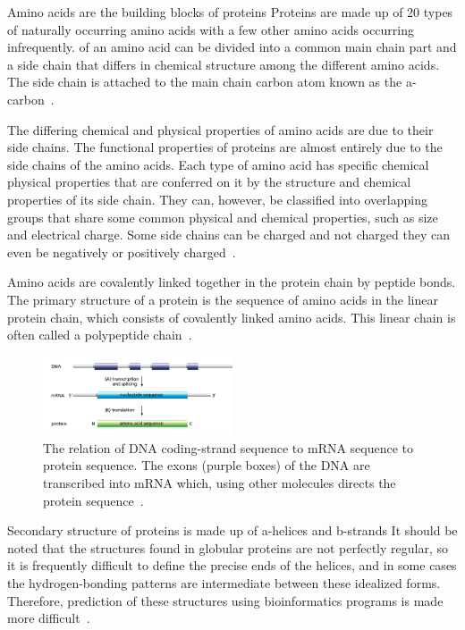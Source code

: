 \documentclass{report}
\begin{document}
Amino acids are the building blocks of proteins
Proteins are made up of 20 types of naturally occurring amino acids with a few other amino acids occurring infrequently. of an amino acid can be divided into a common main chain part and a side chain that differs in chemical structure among the different amino acids. The side chain is attached to the main chain carbon atom known as the a-carbon~\cite{zvelebil_understanding_2008}.

The differing chemical and physical properties of amino acids are due to their side chains. The functional properties of proteins are almost entirely due to the side chains of the amino acids. Each type of amino acid has specific chemical physical properties that are conferred on it by the structure and chemical properties of its side chain. They can, however, be classified into overlapping groups that share some common physical and chemical properties, such as size and electrical charge. Some side chains can be charged and not charged they can even be negatively or positively charged~\cite{zvelebil_understanding_2008}.

Amino acids are covalently linked together in the protein chain by peptide bonds. The primary structure of a protein is the sequence of amino acids in the linear protein chain, which consists of covalently linked amino acids. This linear chain is often called a polypeptide chain~\cite{zvelebil_understanding_2008}.

\begin{figure}
    \centering
    \includegraphics[width=0.5\textwidth]{Transcription and translation.png}
    \caption{\label{fig:Transcription and translation}The relation of DNA coding-strand sequence to mRNA sequence to protein sequence. The exons (purple boxes) of the DNA are transcribed into mRNA which, using other molecules directs the protein sequence~\cite{zvelebil_understanding_2008}.}
\end{figure}

Secondary structure of proteins is made up of a-helices and b-strands
It should be noted that the structures found in globular proteins are not perfectly regular, so it is frequently difficult to define the precise ends of the helices, and in some cases the hydrogen-bonding patterns are intermediate between these idealized forms. Therefore, prediction of these structures using bioinformatics programs is made more difficult~\cite{zvelebil_understanding_2008}.
\end{document}
